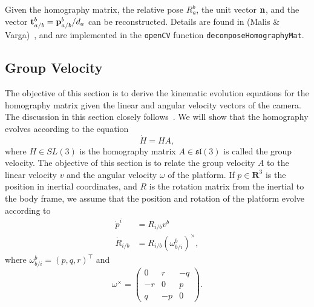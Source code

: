 


Given the homography matrix, the relative pose $R_a^b$, the unit vector $\mathbf{n}$, and the vector $\mathbf{t}_{a/b}^b = \mathbf{p}_{a/b}^b/d_a$ can be reconstructed.  Details are found in (Malis \& Varga)~\cite{MalisVarga07}, and are implemented in the \texttt{openCV} function \texttt{decomposeHomographyMat}.






\subsection{Group Velocity}
The objective of this section is to derive the kinematic evolution equations for the homography matrix given the linear and angular velocity vectors of the camera.  The discussion in this section closely follows~\cite{HamelMahonyTrumpf11}.  We will show that the homography evolves according to the equation
\[
\dot{H}=HA,
\]
where $H\in SL(3)$ is the homography matrix $A\in\mathfrak{sl}(3)$ is called the group velocity.  The objective of this section is to relate the group velocity $A$ to the linear velocity $v$ and the angular velocity $\omega$ of the platform. If $p\in\mathbf{R}^3$ is the position in inertial coordinates, and $R$ is the rotation matrix from the inertial to the body frame,  we assume that the position and rotation of the platform evolve according to 
\begin{align*}
\dot{p}^i &= R_{i/b}v^b \\
\dot{R}_{i/b} &= R_{i/b}(\omega_{b/i}^b)^\times,
\end{align*}
where $\omega_{b/i}^b = (p, q, r)^\top$ and 
\[
\omega^\times = \begin{pmatrix} 0 & r & -q \\ -r & 0 & p \\ q & -p & 0 \end{pmatrix}. 
\]

